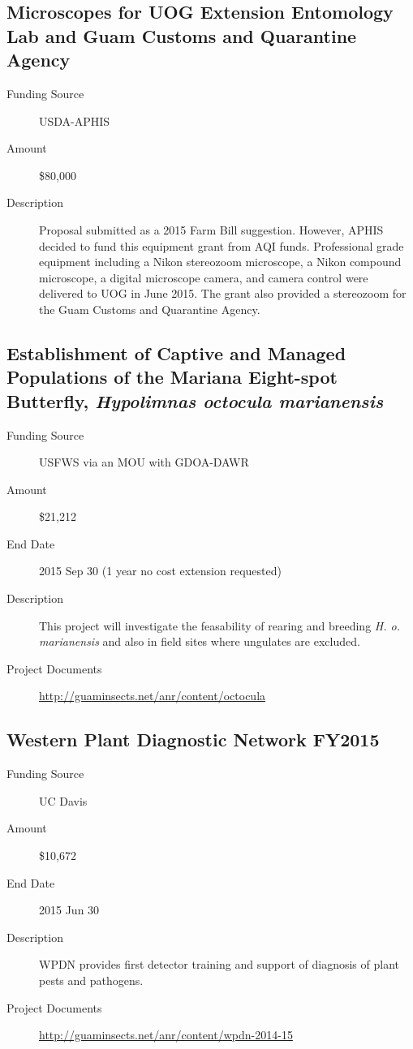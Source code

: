 \documentclass[12pt,oneside,english]{scrbook}
\begin{document}
\subsection{Microscopes for UOG Extension Entomology Lab and Guam Customs and Quarantine Agency}
\begin{description}
	\item[Funding Source] USDA-APHIS
	\item[Amount] \$80,000
	\item[Description] Proposal submitted as a 2015 Farm Bill suggestion. However, APHIS decided to fund this equipment grant from AQI funds. Professional grade equipment including a Nikon stereozoom microscope, a Nikon compound microscope, a digital microscope camera, and camera control were delivered to UOG in June 2015. The grant also provided a stereozoom for the Guam Customs and Quarantine Agency. 
\end{description}

\subsection{Establishment of Captive and Managed Populations of the Mariana Eight-spot Butterfly, \textit{Hypolimnas octocula marianensis}
}
\begin{description}
	\item[Funding Source] USFWS via an MOU with GDOA-DAWR
	\item[Amount] \$21,212
	\item[End Date] 2015 Sep 30 (1 year no cost extension requested)
	\item[Description] This project will investigate the feasability of rearing and breeding \textit{H. o. marianensis} and also in field sites where ungulates are excluded.
	\item[Project Documents]  \url{http://guaminsects.net/anr/content/octocula} 
\end{description}

\subsection{Western Plant Diagnostic Network FY2015}
\begin{description}
	\item[Funding Source] UC Davis
	\item[Amount] \$10,672
	\item[End Date] 2015 Jun 30
	\item[Description] WPDN provides first detector training and support of diagnosis of plant pests and pathogens. 
	\item[Project Documents] \url{http://guaminsects.net/anr/content/wpdn-2014-15}
\end{description}
\end{document}
